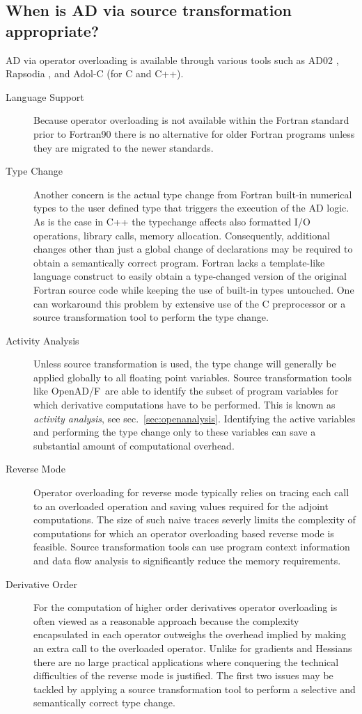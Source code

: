 \documentclass{book}
\newcommand{\OpenADF}{OpenAD/F}
\newcommand{\refsec}[1]{{sec.~\ref{#1}}}
\begin{document}
\subsection{When is AD via source transformation appropriate?}\label{sec:sourceTransformApprop}
AD via operator overloading is available through various tools such as 
AD02 \cite{ad02}, Rapsodia \cite{rapsodiaWeb}, and Adol-C \cite{adolcWeb} (for C and C++). 
\begin{description}
\item[Language Support]
Because operator overloading is not available within the Fortran standard prior to Fortran90 
there is no alternative for older Fortran programs unless they are migrated to the newer standards.
\item[Type Change]
Another concern is the actual type change from Fortran built-in numerical types to 
the user defined type that triggers the execution of the AD logic. 
As is the case in C++ the typechange affects also formatted I/O operations, 
library calls, memory allocation. Consequently, additional changes other than just a global 
change of declarations may be required to obtain a semantically correct program. 
Fortran lacks a template-like language construct to easily obtain 
a type-changed version of the original Fortran source code while keeping 
the use of built-in types untouched.
One can  workaround this problem  by extensive use of 
the C preprocessor or a source transformation tool to perform the type change. 
\item[Activity Analysis] 
Unless source transformation is used, the type change will generally be applied globally to all 
floating point variables. Source transformation tools like \OpenADF\ are able to identify 
the subset of program variables for which derivative computations have to be performed. 
This is known as {\em activity analysis}, see \refsec{sec:openanalysis}. 
Identifying the active variables and performing the type change only to these variables 
can save a substantial amount of computational overhead.
\item[Reverse Mode]
Operator overloading for reverse mode typically relies on tracing each call  
to an  overloaded operation and saving values required for the adjoint computations.
The size of such naive traces severly limits the complexity of computations
for which an operator overloading based reverse mode is feasible.  
Source transformation tools can use program context information and data flow analysis 
to significantly reduce the memory requirements.      
\item[Derivative Order]
For the computation of higher order derivatives operator overloading is often 
viewed as a reasonable approach because the complexity encapsulated in each operator 
outweighs the overhead implied by making an extra call to the overloaded operator.
Unlike for gradients and Hessians there are no large practical applications where 
conquering the technical difficulties of the reverse mode is justified. 
The first two issues may be tackled by applying a source transformation tool to 
perform a selective and semantically correct type change. 
\end{description}
\end{document}
